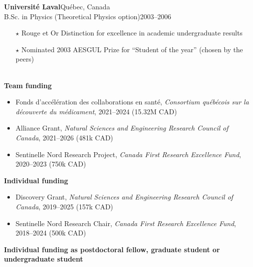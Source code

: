 \documentclass[11pt]{article}
\newcommand{\TitreSection}[1]{\colorbox{background}{\makebox[\textwidth-0.5em][c]{\Large\textrm{\textsc{#1}}}}\vspace{0.75\baselineskip}\\}
\begin{document}
%
\parbox[t]{\textwidth}{%
\textbf{Universit\'e Laval}\hfill Qu\'ebec, Canada\\
B.Sc. in Physics (Theoretical Physics option)\hfill 2003--2006
\begin{itemize}[leftmargin=1.5em]\small
  \item[$\star$] Rouge et Or Distinction for excellence in academic undergraduate results
  \item[$\star$] Nominated 2003 AESGUL Prize for ``Student of the year'' (chosen by the peers)
\end{itemize}
\vspace{0.75\baselineskip}}
%
%
%
%
%
\TitreSection{Funding and Awards}
%
\textbf{Team funding}
%
\begin{itemize}
  \item Fonds d'accélération des collaborations en santé, \textit{Consortium québécois sur la découverte du médicament}, 2021--2024 (15.32M CAD)
  \item Alliance Grant, \textit{Natural Sciences and Engineering Research Council of Canada}, 2021--2026 (481k CAD)
  \item Sentinelle Nord Research Project, \textit{Canada First Research Excellence Fund}, 2020--2023 (750k CAD)
\end{itemize}
%
%
%
\textbf{Individual funding}
%
\begin{itemize}
  \item Discovery Grant, \textit{Natural Sciences and Engineering Research Council of Canada}, 2019--2025 (157k CAD)
  \item Sentinelle Nord Research Chair, \textit{Canada First Research Excellence Fund}, 2018--2024 (500k CAD)
\end{itemize}
%
%
%
\textbf{Individual funding as postdoctoral fellow, graduate student or undergraduate student}
%
\end{document}
